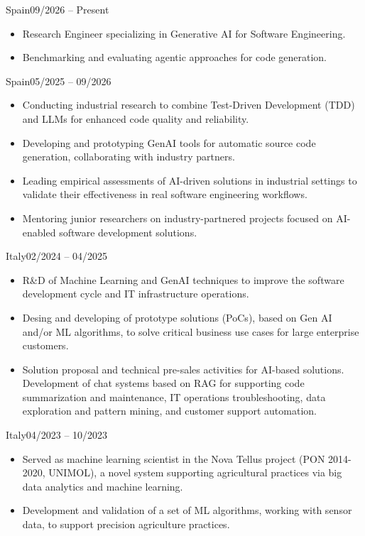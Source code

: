 
	{Spain}{09/2026 – Present}
	\begin{itemize}
\item Research Engineer specializing in Generative AI for Software Engineering.
\item Benchmarking and evaluating agentic approaches for code generation.
	\end{itemize}

	\medskip

	{Spain}{05/2025 – 09/2026}
	\begin{itemize}
\item Conducting industrial research to combine Test-Driven Development (TDD) and LLMs for enhanced code quality and reliability.
\item Developing and prototyping GenAI tools for automatic source code generation, collaborating with industry partners.
\item Leading empirical assessments of AI-driven solutions in industrial settings to validate their effectiveness in real software engineering workflows.
\item Mentoring junior researchers on industry-partnered projects focused on AI-enabled software development solutions.
	\end{itemize}

	\medskip

	{Italy}{02/2024 – 04/2025}
	\begin{itemize}
		\item R\&D of Machine Learning and GenAI techniques to improve the software development cycle and IT infrastructure operations.
		\item Desing and developing of prototype solutions (PoCs), based on Gen AI and/or ML algorithms, to solve critical business use cases for large enterprise customers.
		\item Solution proposal and technical pre-sales activities for AI-based solutions. Development of chat systems based on RAG for supporting code summarization and maintenance, IT operations troubleshooting, data exploration and pattern mining, and customer support automation. 
	\end{itemize}
		
	\medskip

	{Italy}{04/2023 – 10/2023}
	\begin{itemize}
            \item Served as machine learning scientist in the Nova Tellus project (PON 2014-2020, UNIMOL), a novel system supporting agricultural practices via big data analytics and machine learning.
            \item Development and validation of a set of ML algorithms, working with sensor data, to support precision agriculture practices.
	\end{itemize}
	
